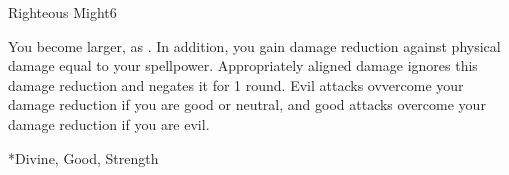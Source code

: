 \begin{spellsection}{Righteous Might}{6}
    \begin{spellheader}
    \end{spellheader}
    \begin{spellcontent}
        \begin{spelltargetinginfo}
        \end{spelltargetinginfo}
        \begin{spelleffects}
            \spellsuccess You become larger, as . In addition, you gain damage reduction against physical damage equal to your spellpower. Appropriately aligned damage ignores this damage reduction and negates it for 1 round. Evil attacks ovvercome your damage reduction if you are good or neutral, and good attacks overcome your damage reduction if you are evil.
            \spelldur \durshort \dismissable
        \end{spelleffects}
    \end{spellcontent}
    \begin{spellfooter}
        *{Divine, Good, Strength}
        \spellnotes \sizingspellnotes
        \miscastexplode
    \end{spellfooter}
\end{spellsection}


